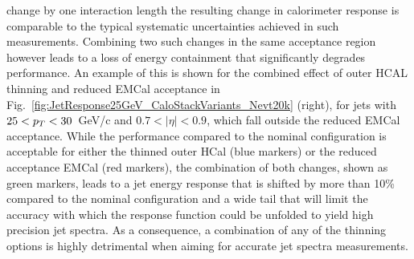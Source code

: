 change by one interaction length the resulting change in calorimeter response is comparable to the typical
systematic uncertainties achieved in such measurements. Combining two such changes in the same acceptance region however leads to 
a loss of energy containment that significantly degrades performance. An example of this is shown for the combined effect of 
outer HCAL thinning and reduced EMCal acceptance in Fig.~\ref{fig:JetResponse25GeV_CaloStackVariants_Nevt20k} (right), for jets with
$25 < \mbox{${p_T}$} < 30$~GeV/c and $0.7 < |\eta| < 0.9$, which fall outside the reduced EMCal acceptance. While the
performance compared to the nominal configuration is acceptable for either the thinned outer HCal (blue markers) or the reduced acceptance EMCal (red markers),
the combination of both changes, shown as green markers, leads to a jet energy response that is shifted by more than 10\% compared to the nominal 
configuration and a wide tail that will limit the accuracy with which the response function could be unfolded 
to yield high precision jet spectra. As a consequence, a combination of any of the thinning options is highly detrimental when aiming for 
accurate jet spectra measurements.

